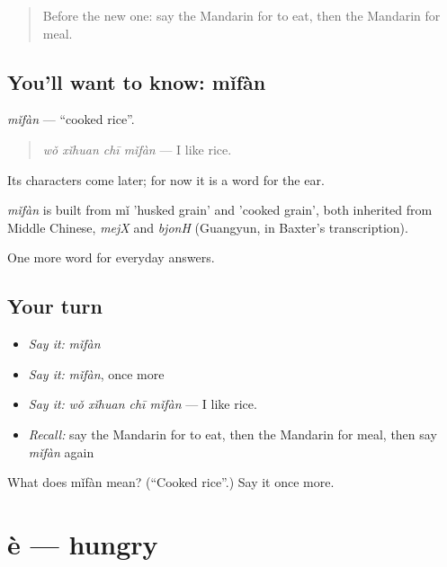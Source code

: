 \begin{quote}
Before the new one: say the Mandarin for to eat, then the Mandarin for meal.
\end{quote}

\subsection*{You'll want to know: mǐfàn}
\emph{mǐfàn} — \textquotedblleft{}cooked rice\textquotedblright{}.

\begin{quote}
\emph{wǒ xǐhuan chī mǐfàn} — I like rice.
\end{quote}

Its characters come later; for now it is a word for the ear.

\begin{cousinweb}
\emph{mǐfàn} is built from mǐ 'husked grain' and  'cooked grain', both inherited from Middle Chinese, \emph{mejX} and \emph{bjonH} (Guangyun, in Baxter's transcription).
\end{cousinweb}

\begin{grammarlens}[title={What you've built}]
One more word for everyday answers.
\end{grammarlens}

\subsection*{Your turn}
\begin{itemize}
\raggedright
  \item \emph{Say it:} \emph{mǐfàn}
  \item \emph{Say it:} \emph{mǐfàn}, once more
  \item \emph{Say it:} \emph{wǒ xǐhuan chī mǐfàn} — I like rice.
  \item \emph{Recall:} say the Mandarin for to eat, then the Mandarin for meal, then say \emph{mǐfàn} again
\end{itemize}

\begin{tcolorbox}[breakable,colback=teal!4,colframe=teal!35!black,title={Before you move on}]
What does mǐfàn mean? (\textquotedblleft{}Cooked rice\textquotedblright{}.) Say it once more.
\end{tcolorbox}
\section[è]{è — hungry}

